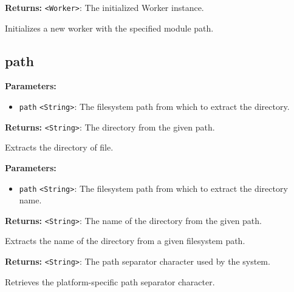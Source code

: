 \documentclass[12pt,a4paper]{article}
\begin{document}
\noindent \textbf{Returns:} \texttt{<Worker>}: The initialized Worker instance.

\noindent Initializes a new worker with the specified module path.


\subsection{path}
\vspace{5mm}
\noindent {}


\noindent \textbf{Parameters:}
\begin{itemize}
  \item \texttt{path} \texttt{<String>}: The filesystem path from which to extract the directory.
\end{itemize}

\noindent \textbf{Returns:} \texttt{<String>}: The directory from the given path.

\noindent Extracts the directory of file.

\vspace{5mm}
\noindent {}


\noindent \textbf{Parameters:}
\begin{itemize}
  \item \texttt{path} \texttt{<String>}: The filesystem path from which to extract the directory name.
\end{itemize}

\noindent \textbf{Returns:} \texttt{<String>}: The name of the directory from the given path.

\noindent Extracts the name of the directory from a given filesystem path.

\vspace{5mm}
\noindent {}


\noindent \textbf{Returns:} \texttt{<String>}: The path separator character used by the system.

\noindent Retrieves the platform-specific path separator character.

\vspace{5mm}
\noindent {}
\end{document}
